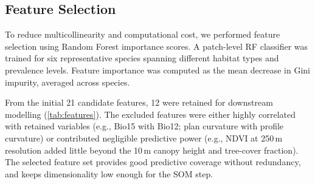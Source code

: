 \subsection{Feature Selection}
\label{sec:feature-selection}

To reduce multicollinearity and computational cost, we performed feature selection 
using Random Forest importance scores. A patch-level RF classifier was trained 
for six representative species spanning different habitat types and prevalence levels. 
Feature importance was computed as the mean decrease in Gini impurity, averaged across 
species.

From the initial 21 candidate features, 12 were retained for downstream modelling 
(\cref{tab:features}). The excluded features were either highly correlated with 
retained variables (e.g., Bio15 with Bio12; plan curvature with profile curvature) 
or contributed negligible predictive power (e.g., NDVI at 250\,m resolution added 
little beyond the 10\,m canopy height and tree-cover fraction). The selected feature 
set provides good predictive coverage without redundancy, and keeps dimensionality low 
enough for the SOM step. 

